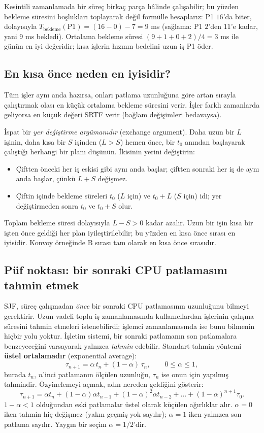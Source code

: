 \documentclass[11pt,a4paper]{article}
\newcommand{\term}[1]{\textbf{\color{mintdeep}#1}}
\begin{document}
Kesintili zamanlamada bir süreç birkaç parça hâlinde çalışabilir; bu yüzden bekleme süresini boşlukları toplayarak değil formülle hesaplarız: P1 $16$'da biter, dolayısıyla $T_{\text{bekleme}}(\text{P1}) = (16-0) - 7 = 9$ ms (sağlama: P1 $2$'den $11$'e kadar, yani $9$ ms bekledi). Ortalama bekleme süresi $(9+1+0+2)/4 = 3$ ms ile günün en iyi değeridir; kısa işlerin hızının bedelini uzun iş P1 öder.

\subsection{En kısa önce neden en iyisidir?}

\begin{keyidea}
Tüm işler aynı anda hazırsa, onları patlama uzunluğuna göre artan sırayla çalıştırmak olası en küçük ortalama bekleme süresini verir. İşler farklı zamanlarda geliyorsa en küçük değeri SRTF verir (bağlam değişimleri bedavaysa).
\end{keyidea}

İspat bir \emph{yer değiştirme argümanıdır} (exchange argument). Daha uzun bir $L$ işinin, daha kısa bir $S$ işinden ($L > S$) hemen önce, bir $t_0$ anından başlayarak çalıştığı herhangi bir planı düşünün. İkisinin yerini değiştirin:
\begin{itemize}
  \item Çiftten önceki her iş eskisi gibi aynı anda başlar; çiftten sonraki her iş de aynı anda başlar, çünkü $L+S$ değişmez.
  \item Çiftin içinde bekleme süreleri $t_0$ ($L$ için) ve $t_0+L$ ($S$ için) idi; yer değiştirmeden sonra $t_0$ ve $t_0+S$ olur.
\end{itemize}
Toplam bekleme süresi dolayısıyla $L-S>0$ kadar azalır. Uzun bir işin kısa bir işten önce geldiği her plan iyileştirilebilir; bu yüzden en kısa önce sırası en iyisidir. Konvoy örneğinde B sırası tam olarak en kısa önce sırasıdır.

\subsection{Püf noktası: bir sonraki CPU patlamasını tahmin etmek}

SJF, süreç çalışmadan \emph{önce} bir sonraki CPU patlamasının uzunluğunu bilmeyi gerektirir. Uzun vadeli toplu iş zamanlamasında kullanıcılardan işlerinin çalışma süresini tahmin etmeleri istenebilirdi; işlemci zamanlamasında ise bunu bilmenin hiçbir yolu yoktur. İşletim sistemi, bir sonraki patlamanın son patlamalara benzeyeceğini varsayarak yalnızca \emph{tahmin} edebilir. Standart tahmin yöntemi \term{üstel ortalamadır} (exponential average):
\[
\tau_{n+1} = \alpha\, t_n + (1-\alpha)\, \tau_n, \qquad 0 \le \alpha \le 1,
\]
burada $t_n$, $n$'inci patlamanın ölçülen uzunluğu, $\tau_n$ ise onun için yapılmış tahmindir. Özyinelemeyi açmak, adın nereden geldiğini gösterir:
\[
\tau_{n+1} = \alpha t_n + (1-\alpha)\alpha t_{n-1} + (1-\alpha)^2 \alpha t_{n-2} + \dots + (1-\alpha)^{n+1}\tau_0 .
\]
$1-\alpha<1$ olduğundan eski patlamalar üstel olarak küçülen ağırlıklar alır. $\alpha=0$ iken tahmin hiç değişmez (yakın geçmiş yok sayılır); $\alpha=1$ iken yalnızca son patlama sayılır. Yaygın bir seçim $\alpha = 1/2$'dir.
\end{document}
